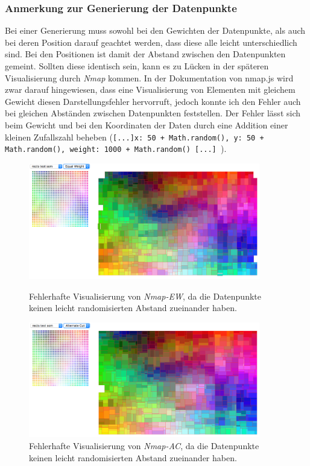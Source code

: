 \documentclass[12pt, ngerman, utf8]{article}
\begin{document}
\subsubsection{Anmerkung zur Generierung der Datenpunkte}
Bei einer Generierung muss sowohl bei den Gewichten der Datenpunkte, als auch bei deren Position darauf geachtet werden, dass diese alle leicht unterschiedlich sind. Bei den Positionen ist damit der Abstand zwischen den Datenpunkten gemeint. Sollten diese identisch sein, kann es zu Lücken in der späteren Visualisierung durch \emph{Nmap} kommen. In der Dokumentation von nmap.js wird zwar darauf hingewiesen, dass eine Visualisierung von Elementen mit gleichem Gewicht diesen Darstellungsfehler hervorruft, jedoch konnte ich den Fehler auch bei gleichen Abständen zwischen Datenpunkten feststellen. Der Fehler lässt sich beim Gewicht und bei den Koordinaten der Daten durch eine Addition einer kleinen Zufallszahl beheben (\texttt{[...]x: 50 + Math.random(), y: 50 + Math.random(), weight: 1000 + Math.random() [...] }).
\begin{figure}[h]
\centering
\begin{minipage}{.45\textwidth}
  \centering
  \includegraphics[width=0.9\textwidth]{./imgs/nmap-ew_fehler.png}
  \caption{Fehlerhafte Visualisierung von \emph{Nmap-EW}, da die Datenpunkte keinen leicht randomisierten Abstand zueinander haben.}
  \label{fig:nmap-ew-fehler}
\end{minipage}%
\hfill
\begin{minipage}{.45\textwidth}
  \centering
  \includegraphics[width=0.9\textwidth]{./imgs/nmap-ac_fehler.png}
  \caption{Fehlerhafte Visualisierung von \emph{Nmap-AC}, da die Datenpunkte keinen leicht randomisierten Abstand zueinander haben.}
  \label{fig:nmap-ac-fehler}
\end{minipage}
\end{figure}
\end{document}
